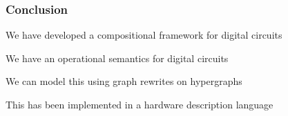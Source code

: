     \begin{frame}
        \frametitle{Conclusion}

        We have developed a \alert{compositional framework} for digital circuits

        \pause

        We have an \alert{operational semantics} for digital circuits

        \pause

        We can model this using \alert{graph rewrites} on \alert{hypergraphs}

        \pause

        This has been \alert{implemented} in a hardware description language

    \end{frame}
